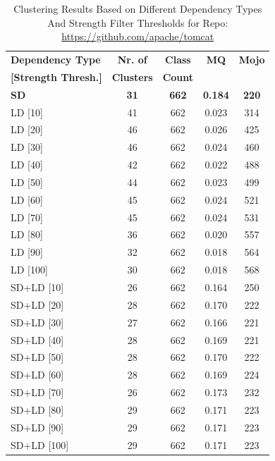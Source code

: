 \documentclass{ieeeaccess}
\begin{document}
\begin{table}[h]
\caption{Clustering Results Based on Different Dependency Types And Strength Filter Thresholds for Repo: \url{https://github.com/apache/tomcat}}
\label{tab:clustering_results}
\centering
\setlength{\tabcolsep}{10pt}
\begin{tabular}{|l|c|c|c|c|}
\hline
\textbf{Dependency Type} & \textbf{Nr. of} & \textbf{Class} & \textbf{MQ} & \textbf{Mojo} \\
\textbf{[Strength Thresh.]} & \textbf{Clusters} & \textbf{Count} &  &  \\
\hline
\textbf{SD} & \textbf{31} & \textbf{662} & \textbf{0.184} & \textbf{220} \\
LD [10] & 41 & 662 & 0.023 & 314 \\
LD [20] & 46 & 662 & 0.026 & 425 \\
LD [30] & 46 & 662 & 0.024 & 460 \\
LD [40] & 42 & 662 & 0.022 & 488 \\
LD [50] & 44 & 662 & 0.023 & 499 \\
LD [60] & 45 & 662 & 0.024 & 521 \\
LD [70] & 45 & 662 & 0.024 & 531 \\
LD [80] & 36 & 662 & 0.020 & 557 \\
LD [90] & 32 & 662 & 0.018 & 564 \\
LD [100] & 30 & 662 & 0.018 & 568 \\
\hline
SD+LD [10] & 26 & 662 & 0.164 & 250 \\
SD+LD [20] & 28 & 662 & 0.170 & 222 \\
SD+LD [30] & 27 & 662 & 0.166 & 221 \\
SD+LD [40] & 28 & 662 & 0.169 & 221 \\
SD+LD [50] & 28 & 662 & 0.170 & 222 \\
SD+LD [60] & 28 & 662 & 0.169 & 224 \\
SD+LD [70] & 26 & 662 & 0.173 & 232 \\
SD+LD [80] & 29 & 662 & 0.171 & 223 \\
SD+LD [90] & 29 & 662 & 0.171 & 223 \\
SD+LD [100] & 29 & 662 & 0.171 & 223 \\
\hline
\end{tabular}
\end{table}
\end{document}
